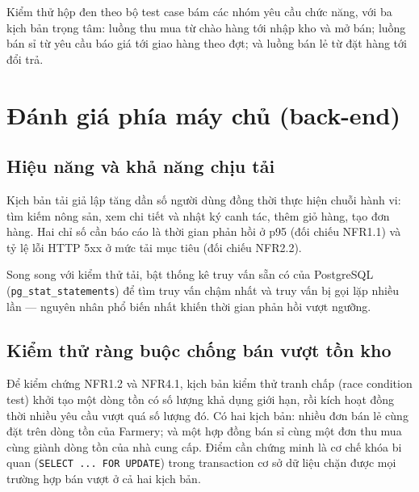 Kiểm thử hộp đen theo bộ test case bám các nhóm yêu cầu chức năng, với ba kịch bản trọng tâm: luồng thu mua từ chào hàng tới nhập kho và mở bán; luồng bán sỉ từ yêu cầu báo giá tới giao hàng theo đợt; và luồng bán lẻ từ đặt hàng tới đổi trả.


\section{Đánh giá phía máy chủ (back-end)}
\label{sec:danhgiahieunang}

\subsection{Hiệu năng và khả năng chịu tải}

Kịch bản tải giả lập tăng dần số người dùng đồng thời thực hiện chuỗi hành vi: tìm kiếm nông sản, xem chi tiết và nhật ký canh tác, thêm giỏ hàng, tạo đơn hàng. Hai chỉ số cần báo cáo là thời gian phản hồi ở p95 (đối chiếu NFR1.1) và tỷ lệ lỗi HTTP 5xx ở mức tải mục tiêu (đối chiếu NFR2.2).

Song song với kiểm thử tải, bật thống kê truy vấn sẵn có của PostgreSQL (\texttt{pg\_stat\_statements}) để tìm truy vấn chậm nhất và truy vấn bị gọi lặp nhiều lần --- nguyên nhân phổ biến nhất khiến thời gian phản hồi vượt ngưỡng.


\subsection{Kiểm thử ràng buộc chống bán vượt tồn kho}

Để kiểm chứng NFR1.2 và NFR4.1, kịch bản kiểm thử tranh chấp (race condition test) khởi tạo một dòng tồn có số lượng khả dụng giới hạn, rồi kích hoạt đồng thời nhiều yêu cầu vượt quá số lượng đó. Có hai kịch bản: nhiều đơn bán lẻ cùng đặt trên dòng tồn của Farmery; và một hợp đồng bán sỉ cùng một đơn thu mua cùng giành dòng tồn của nhà cung cấp. Điểm cần chứng minh là cơ chế khóa bi quan (\texttt{SELECT ... FOR UPDATE}) trong transaction cơ sở dữ liệu chặn được mọi trường hợp bán vượt ở cả hai kịch bản.


